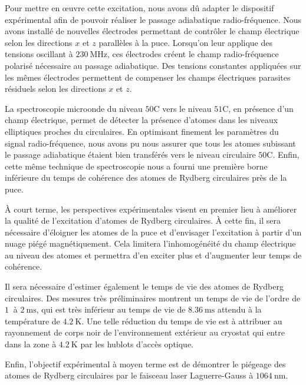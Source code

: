 Pour mettre en \oe uvre cette excitation, nous avons dû adapter le dispositif expérimental afin de pouvoir réaliser le passage adiabatique radio-fréquence.
Nous avons installé de nouvelles électrodes permettant de contrôler le champ électrique selon les directions $x$ et $z$ parallèles à la puce.
Lorsqu'on leur applique des tensions oscillant à $\SI{230}{\MHz}$, ces électrodes créent le champ radio-fréquence polarisé nécessaire au passage adiabatique.
Des tensions constantes appliquées sur les mêmes électrodes permettent de compenser les champs électriques parasites résiduels selon les directions $x$ et $z$.

La spectroscopie microonde du niveau $\mathrm{50C}$ vers le niveau $\mathrm{51C}$, en présence d'un champ électrique, permet de détecter la présence d'atomes dans les niveaux elliptiques proches du circulaires.
En optimisant finement les paramètres du signal radio-fréquence, nous avons pu nous assurer que tous les atomes subissant le passage adiabatique étaient bien transférés vers le niveau circulaire $\mathrm{50C}$.
Enfin, cette même technique de spectroscopie nous a fourni une première borne inférieure du temps de cohérence des atomes de Rydberg circulaires près de la puce.

\`A court terme, les perspectives expérimentales visent en premier lieu à améliorer la qualité de l'excitation d'atomes de Rydberg circulaires.
\`A cette fin, il sera nécessaire d'éloigner les atomes de la puce et d'envisager l'excitation à partir d'un nuage piégé magnétiquement.
Cela limitera l'inhomogénéité du champ électrique au niveau des atomes et permettra d'en exciter plus et d'augmenter leur temps de cohérence.

Il sera nécessaire d'estimer également le temps de vie des atomes de Rydberg circulaires.
Des mesures très préliminaires montrent un temps de vie de l'ordre de $\SI{1}{}$ à $\SI{2}{\ms}$, qui est très inférieur au temps de vie de $\SI{8.36}{\ms}$ attendu à la température de $\SI{4.2}{\K}$.
Une telle réduction du temps de vie est à attribuer au rayonnement de corps noir de l'environnement extérieur au cryostat qui entre dans la zone à $\SI{4.2}{\K}$ par les hublots d'accès optique.

Enfin, l'objectif expérimental à moyen terme est de démontrer le piégeage des atomes de Rydberg circulaires par le faisceau laser Laguerre-Gauss à $\SI{1064}{\nano\meter}$.

